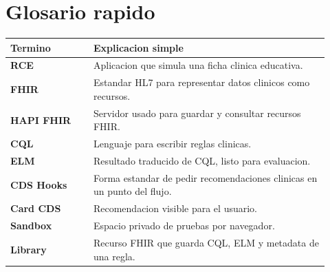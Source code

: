 \documentclass[12pt,letterpaper]{article}
\begin{document}
\section{Glosario rapido}

\begin{longtable}{>{\bfseries}p{0.24\linewidth}p{0.68\linewidth}}
Termino & Explicacion simple \\
\hline
RCE & Aplicacion que simula una ficha clinica educativa. \\
FHIR & Estandar HL7 para representar datos clinicos como recursos. \\
HAPI FHIR & Servidor usado para guardar y consultar recursos FHIR. \\
CQL & Lenguaje para escribir reglas clinicas. \\
ELM & Resultado traducido de CQL, listo para evaluacion. \\
CDS Hooks & Forma estandar de pedir recomendaciones clinicas en un punto del flujo. \\
Card CDS & Recomendacion visible para el usuario. \\
Sandbox & Espacio privado de pruebas por navegador. \\
Library & Recurso FHIR que guarda CQL, ELM y metadata de una regla. \\
\end{longtable}
\end{document}
